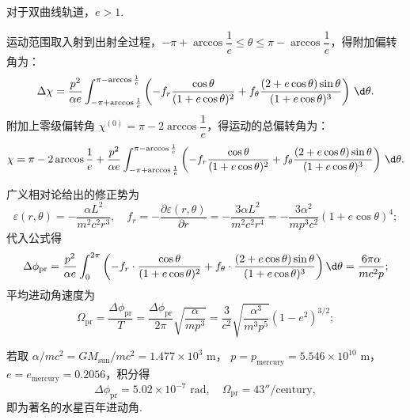 对于双曲线轨道，\(e > 1\).

运动范围取入射到出射全过程，\(-\pi + \arccos \dfrac{1}{e} \leq \theta \leq \pi - \arccos \dfrac{1}{e}\)，得附加偏转角为：
\begin{equation*}
	\Delta \chi = \dfrac{p^2}{\alpha e} \int_{-\pi + \arccos \frac{1}{e}}^{\pi - \arccos \frac{1}{e}} \left( -f_r \dfrac{\cos\theta}{(1 + e \cos\theta)^2} + f_{\theta} \dfrac{(2 + e \cos\theta) \sin\theta}{(1 + e \cos\theta)^3} \right) \, \d \theta.
\end{equation*}
附加上零级偏转角 \(\chi^{(0)} = \pi - 2 \arccos \dfrac{1}{e}\)，得运动的总偏转角为：
\begin{equation*}
	\chi = \pi - 2 \arccos \frac{1}{e} + \dfrac{p^2}{\alpha e} \int_{-\pi + \arccos \frac{1}{e}}^{\pi - \arccos \frac{1}{e}} \left( -f_r \dfrac{\cos\theta}{(1 + e \cos\theta)^2} + f_{\theta} \dfrac{(2 + e \cos\theta) \sin\theta}{(1 + e \cos\theta)^3} \right) \, \d \theta.
\end{equation*}

\begin{example}
	广义相对论给出的修正势为
	\begin{equation*}
		\varepsilon (r, \theta) = -\frac{\alpha  L^2}{m^2 c^2 r^3},
		\quad
		f_r = -\frac{\partial \varepsilon (r, \theta)}{\partial r} = -\frac{3 \alpha  L^2}{m^2 c^2 r^4} = -\frac{3 \alpha^2}{m p^3 c^2} (1 + e \cos  \theta)^4;
	\end{equation*}
	代入公式得
	\begin{equation*}
		\Delta\phi_{\text{pr}} = \frac{p^2}{\alpha e} \int_0^{2\pi} \left(
		-f_r \cdot \frac{\cos \theta}{(1 + e \cos \theta)^2}
		+
		f_\theta \cdot \frac{(2 + e \cos \theta) \sin \theta}{(1 + e \cos \theta)^3}
		\right) \d \theta
		= \frac{6 \pi  \alpha}{m c^2 p};
	\end{equation*}
	平均进动角速度为
	\begin{equation*}
		\Omega_{\text{pr}} =
		\frac{\Delta\phi_{\text{pr}}}{T} =  \frac{\Delta\phi_{\text{pr}}}{2\pi}\sqrt{\frac{\alpha}{m p^3}}=
		\frac{3}{c^2} \sqrt{\frac{\alpha^3}{m^3 p^5}} (1 - e^2)^{3/2};
	\end{equation*}

	若取 \(\alpha/mc^2 = G M_{\text{sun}}/mc^2 = 1.477 \times 10^3 \text{ m}\)，
	\(p = p_{\text{mercury}} = 5.546 \times 10^{10} \text{ m}\)，
	\(e = e_{\text{mercury}} = 0.2056\)，积分得
	\begin{equation*}
		\Delta\phi_{\text{pr}} = 5.02 \times 10^{-7} \text{ rad}, \quad
		\Omega_{\text{pr}} = 43''/\text{century},
	\end{equation*}
	即为著名的水星百年进动角.
\end{example}

